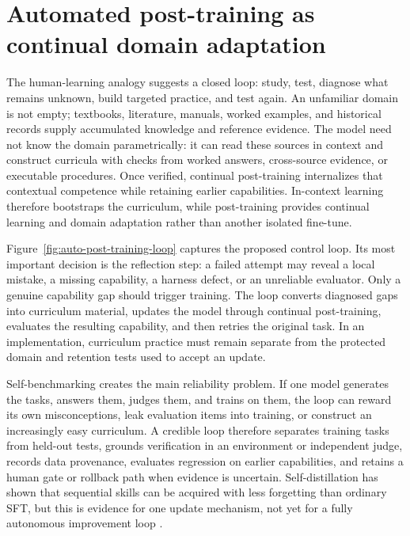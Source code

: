 \section{Automated post-training as continual domain adaptation}

The human-learning analogy suggests a closed loop: study, test, diagnose what remains
unknown, build targeted practice, and test again. An unfamiliar domain is not empty;
textbooks, literature, manuals, worked examples, and historical records supply accumulated
knowledge and reference evidence. The model need not know the domain parametrically: it
can read these sources in context and construct curricula with checks from worked answers,
cross-source evidence, or executable procedures. Once verified, continual post-training
internalizes that contextual competence while retaining earlier capabilities. In-context
learning therefore bootstraps the curriculum, while post-training provides continual
learning and domain adaptation rather than another isolated fine-tune.

Figure~\ref{fig:auto-post-training-loop} captures the proposed control loop. Its most
important decision is the reflection step: a failed attempt may reveal a local mistake, a
missing capability, a harness defect, or an unreliable evaluator. Only a genuine capability
gap should trigger training. The loop converts diagnosed gaps into curriculum material,
updates the model through continual post-training, evaluates the resulting capability,
and then retries the original task. In an implementation, curriculum practice must remain
separate from the protected domain and retention tests used to accept an update.



Self-benchmarking creates the main reliability problem. If one model generates the tasks,
answers them, judges them, and trains on them, the loop can reward its own misconceptions,
leak evaluation items into training, or construct an increasingly easy curriculum. A
credible loop therefore separates training tasks from held-out tests, grounds verification
in an environment or independent judge, records data provenance, evaluates regression on
earlier capabilities, and retains a human gate or rollback path when evidence is uncertain.
Self-distillation has shown that sequential skills can be acquired with less forgetting
than ordinary SFT, but this is evidence for one update mechanism, not yet for a fully
autonomous improvement loop \citep{shenfeld2026selfdistillation}.

